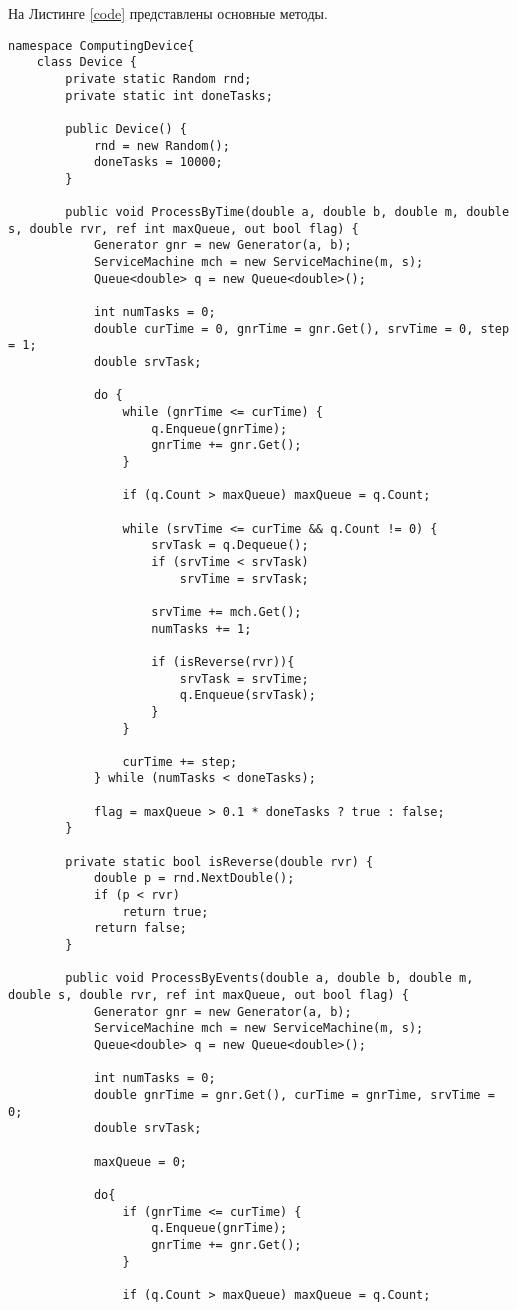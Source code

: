 На Листинге \ref{code} представлены основные методы.

\begin{lstlisting}[label=code, caption = Основные методы]
namespace ComputingDevice{
	class Device {
		private static Random rnd;
		private static int doneTasks;
		
		public Device() {
			rnd = new Random();
			doneTasks = 10000;
		}
		
		public void ProcessByTime(double a, double b, double m, double s, double rvr, ref int maxQueue, out bool flag) {
			Generator gnr = new Generator(a, b);
			ServiceMachine mch = new ServiceMachine(m, s);
			Queue<double> q = new Queue<double>();
			
			int numTasks = 0;
			double curTime = 0, gnrTime = gnr.Get(), srvTime = 0, step = 1;
			double srvTask;
			
			do {
				while (gnrTime <= curTime) {
					q.Enqueue(gnrTime);
					gnrTime += gnr.Get();
				}
				
				if (q.Count > maxQueue) maxQueue = q.Count;
				
				while (srvTime <= curTime && q.Count != 0) {
					srvTask = q.Dequeue();
					if (srvTime < srvTask)
						srvTime = srvTask;
					
					srvTime += mch.Get();
					numTasks += 1;
					
					if (isReverse(rvr)){
						srvTask = srvTime;
						q.Enqueue(srvTask);
					}
				}
				
				curTime += step;
			} while (numTasks < doneTasks);
			
			flag = maxQueue > 0.1 * doneTasks ? true : false;
		}
		
		private static bool isReverse(double rvr) {
			double p = rnd.NextDouble();
			if (p < rvr)
				return true;
			return false;
		}
		
		public void ProcessByEvents(double a, double b, double m, double s, double rvr, ref int maxQueue, out bool flag) {
			Generator gnr = new Generator(a, b);
			ServiceMachine mch = new ServiceMachine(m, s);
			Queue<double> q = new Queue<double>();
			
			int numTasks = 0;
			double gnrTime = gnr.Get(), curTime = gnrTime, srvTime = 0;
			double srvTask;
			
			maxQueue = 0;
			
			do{
				if (gnrTime <= curTime) {
					q.Enqueue(gnrTime);
					gnrTime += gnr.Get();
				}
				
				if (q.Count > maxQueue) maxQueue = q.Count;
				

\end{lstlisting}
